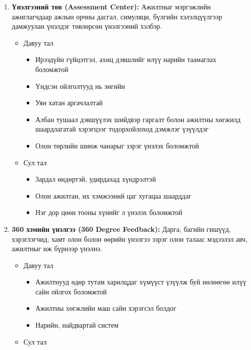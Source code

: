 \begin{enumerate}
\begin{enumerate}
        \item \textbf{Үнэлгээний төв (Assessment Center):} Ажилтныг мэргэжлийн ажиглагчдаар ажлын орчны
         дасгал, симуляци, бүлгийн хэлэлцүүлгээр дамжуулан үнэлдэг төвлөрсөн үнэлгээний хэлбэр.
        \begin{itemize}
            \item Давуу тал
            \begin{itemize}
                \item Ирээдүйн гүйцэтгэл, ахиц дэвшлийг илүү нарийн таамаглах боломжтой
                \item Үндсэн ойлголтууд нь энгийн
                \item Уян хатан аргачлалтай
                \item Албан тушаал дэвшүүлэх шийдвэр гаргалт болон ажилтны хөгжилд шаардлагатай хэрэгцээг тодорхойлоход дэмжлэг үзүүлдэг
                \item Олон төрлийн шинж чанарыг зэрэг үнэлэх боломжтой
            \end{itemize}
            \item Сул тал
            \begin{itemize}
                \item Зардал өндөртэй, удирдахад хүндрэлтэй
                \item Олон ажилтан, их хэмжээний цаг хугацаа шаарддаг
                \item Нэг дор цөөн тооны хүнийг л үнэлэх боломжтой
            \end{itemize}
        \end{itemize}
        \item \textbf{360 хэмийн үнэлгээ (360 Degree Feedback):} Дарга, багийн гишүүд, хэрэглэгчид, 
        хамт олон болон өөрийн үнэлгээ зэрэг олон талаас мэдээлэл авч, ажилтныг иж бүрнээр үнэлнэ.
        \begin{itemize}
            \item Давуу тал
            \begin{itemize}
                \item Ажилтнууд өдөр тутам харилцдаг хүмүүст үзүүлж буй нөлөөгөө илүү сайн ойлгох боломжтой
                \item Ажилтны хөгжлийн маш сайн хэрэгсэл болдог
                \item Нарийн, найдвартай систем
            \end{itemize}
            \item Сул тал
            \begin{itemize}

\end{itemize}
\end{itemize}
\end{enumerate}
\end{enumerate}
